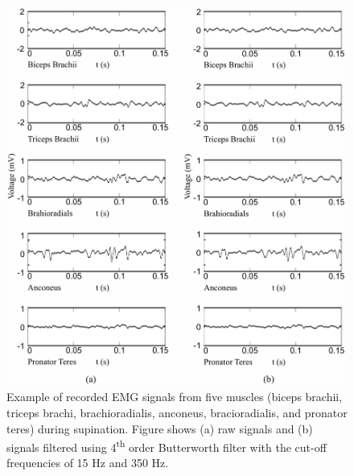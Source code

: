 \begin{figure}[ht]
\centering
\includegraphics[width=0.99\textwidth]{Images/figure3_B4.png}
\caption{Example of recorded EMG signals from five muscles (biceps brachii, triceps brachi, brachioradialis, anconeus, bracioradialis, and pronator teres) during supination. Figure shows (a) raw signals and (b) signals filtered using 4\textsuperscript{th} order Butterworth filter with the cut-off frequencies of 15 Hz and 350 Hz.}
\label{fig:3-B4}
\end{figure}   

